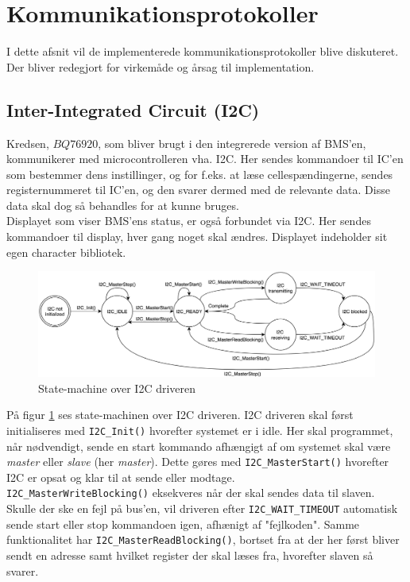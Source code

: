 \section{Kommunikationsprotokoller}

I dette afsnit vil de implementerede kommunikationsprotokoller blive diskuteret. Der bliver redegjort for virkemåde og årsag til implementation. 

\subsection{Inter-Integrated Circuit (I2C)}
Kredsen, $BQ76920$, som bliver brugt i den integrerede version af BMS'en, kommunikerer med microcontrolleren vha. I2C. Her sendes kommandoer til IC'en som bestemmer dens instillinger, og for f.eks. at læse cellespændingerne, sendes registernummeret til IC'en, og den svarer dermed med de relevante data. Disse data skal dog så behandles for at kunne bruges. \\

Displayet som viser BMS'ens status, er også forbundet via I2C. Her sendes kommandoer til display, hver gang noget skal ændres. Displayet indeholder sit egen character bibliotek. 

\begin{figure}[h]
	\centering
	\includegraphics[width=15cm]{billeder/I2C_sm.png}
	\caption{State-machine over I2C driveren}
	\label{fig:I2C_sm}
\end{figure}

På figur \ref{fig:I2C_sm} ses state-machinen over I2C driveren. I2C driveren skal først initialiseres med \verb|I2C_Init()| hvorefter systemet er i idle. Her skal programmet, når nødvendigt, sende en start kommando afhængigt af om systemet skal være \textit{master} eller \textit{slave} (her \textit{master}). Dette gøres med \verb|I2C_MasterStart()| hvorefter I2C er opsat og klar til at sende eller modtage. \\

\verb|I2C_MasterWriteBlocking()| eksekveres når der skal sendes data til slaven. Skulle der ske en fejl på bus'en, vil driveren efter \verb|I2C_WAIT_TIMEOUT| automatisk sende start eller stop kommandoen igen, afhænigt af "fejlkoden". Samme funktionalitet har \verb|I2C_MasterReadBlocking()|, bortset fra at der her først bliver sendt en adresse samt hvilket register der skal læses fra, hvorefter slaven så svarer. \\

